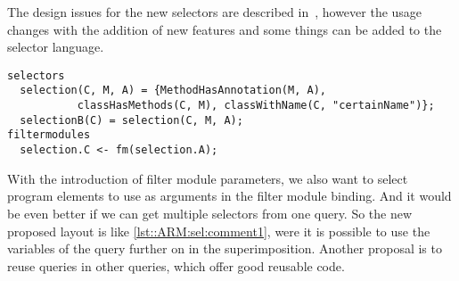 The design issues for the new selectors are described in~\cite{Havinga2005}, however the usage changes with the addition of new features and some things can be added to the selector language.

\begin{lstlisting}[caption={A selector with extended syntax}, label = lst::ARM:sel:comment1,
style=listing, language =ComposeStar, float = tpb]
selectors
  selection(C, M, A) = {MethodHasAnnotation(M, A),
           classHasMethods(C, M), classWithName(C, "certainName")};
  selectionB(C) = selection(C, M, A);
filtermodules
  selection.C <- fm(selection.A);
\end{lstlisting}
With the introduction of filter module parameters, we also want to select program elements to use as arguments in the
filter module binding. And it would be even better if we can get multiple selectors from one query. So the new proposed
layout is like \autoref{lst::ARM:sel:comment1}, were it is possible to use the variables of the query further on in
the superimposition. Another proposal is to reuse queries in other queries, which offer good reusable code.
